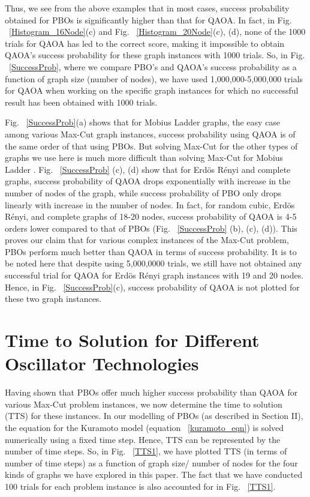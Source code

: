 \documentclass[%
 reprint,
 amsmath,amssymb,
 aps,
]{revtex4-2}
\begin{document}
Thus, we see from the above examples that in most cases, success probability obtained for PBOs is significantly higher than that for QAOA. In fact, in  Fig. ~\ref{Histogram_16Node}(c) and Fig. ~\ref{Histogram_20Node}(c), (d), none of the 1000 trials for QAOA has led to the correct score, making it impossible to obtain QAOA's success probability for these graph instances with 1000 trials. So, in Fig. ~\ref{SuccessProb}, where we compare PBO's and QAOA's success probability as a function of graph size (number of nodes), we have used 1,000,000-5,000,000 trials for QAOA when working on the specific graph instances for which no successful result has been obtained with 1000 trials. 

Fig. ~\ref{SuccessProb}(a) shows that for Mobius Ladder graphs, the easy case among various Max-Cut graph instances, success probability using QAOA is of the same order of that using PBOs. But solving Max-Cut for the other types of graphs we use here is much more difficult than solving Max-Cut for Mobius Ladder \citep{MobiusLadder_PolySoln,QAOA_ErdosRenyi,QAOA_CompleteGraph}. Fig. ~\ref{SuccessProb} (c), (d) show that for Erd{\"o}s R{\'e}nyi and complete graphs, success probability of QAOA drops exponentially with increase in the number of nodes of the graph, while success probability of PBO only drops linearly with increase in the number of nodes. In fact, for random cubic, Erd{\"o}s R{\'e}nyi, and complete graphs of 18-20 nodes, success probability of QAOA is 4-5 orders lower compared to that of PBOs (Fig. ~\ref{SuccessProb} (b), (c), (d)). This proves our claim that for various complex instances of the Max-Cut problem, PBOs perform much better than QAOA in terms of success probability. 
It is to be noted here that despite using 5,000,0000 trials, we still have not obtained any successful trial for QAOA for Erd{\"o}s R{\'e}nyi
graph instances with 19 and 20 nodes. Hence, in Fig. ~\ref{SuccessProb}(c), success probability of QAOA is not plotted for these two graph instances. 



\section{Time to Solution for Different Oscillator Technologies}



Having shown that PBOs offer much higher success probability than QAOA for various Max-Cut problem instances, we now determine the time to solution (TTS) for these instances. In our modelling of PBOs (as described in Section II), the equation for the Kuramoto model (equation ~\ref{kuramoto_eqn}) is solved numerically using a fixed time step. Hence, TTS can be represented by the number of time steps. So, in Fig. ~\ref{TTS1}, we have plotted TTS (in terms of number of time steps) as a function of graph size/ number of nodes for the four kinds of graphs we have explored in this paper. The fact that we have conducted 100 trials for each problem instance is also accounted for in Fig. ~\ref{TTS1}. 
\end{document}
